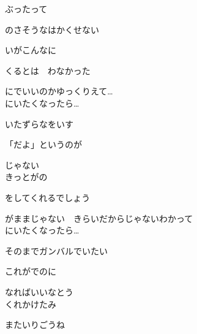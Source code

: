 {ぶったって

のさそうなはかくせない

いがこんなに

くるとは　わなかった

にでいいのかゆっくりえて…
\\

にいたくなったら…

いたずらなをいす

「だよ」というのが

じゃない
\\

きっとがの

をしてくれるでしょう

がままじゃない　きらいだからじゃないわかって
\\

にいたくなったら…

そのまでガンバルでいたい

これがでのに

なればいいなとう
\\

くれかけたみ

またいりごうね

}